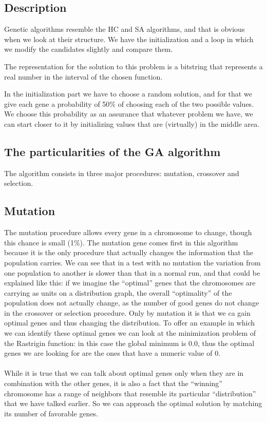 \documentclass{article}
\begin{document}
\subsection{Description}
Genetic algorithms resemble the HC and SA algorithms, and that is obvious when we look at their structure. We have the initialization and a loop in which we modify the candidates slightly and compare them.

The representation for the solution to this problem is a bitstring that represents a real number in the interval of the chosen function.

In the initialization part we have to choose a random solution, and for that we give each gene a probability of 50\% of choosing each of the two possible values. We choose this probability as an assurance that whatever problem we have, we can start closer to it by initializing values that are (virtually) in the middle area.

\subsection{The particularities of the GA algorithm}
The algorithm consists in three major procedures: mutation, crossover and selection.

\subsection{Mutation}
The mutation procedure allows every gene in a chromosome to change, though this chance is small (1\%). The mutation gene comes first in this algorithm because it is the only procedure that actually changes the information that the population carries. We can see that in a test with no mutation the variation from one population to another is slower than that in a normal run, and that could be explained like this: if we imagine the “optimal” genes that the chromosomes are carrying as units on a distribution graph, the overall “optimality” of the population does not actually change, as the number of good genes do not change in the crossover or selection procedure. Only by mutation it is that we ca gain optimal genes and thus changing the distribution. To offer an example in which we can identify these optimal genes we can look at the minimization problem of the Rastrigin function: in this case the global minimum is 0.0, thus the optimal genes we are looking for are the ones that have a numeric value of 0. \\\\
While it is true that we can talk about optimal genes only when they are in combination with the other genes, it is also a fact that the “winning” chromosome has a range of neighbors that resemble its particular “distribution” that we have talked earlier. So we can approach the optimal solution by matching its number of favorable genes.
\end{document}
